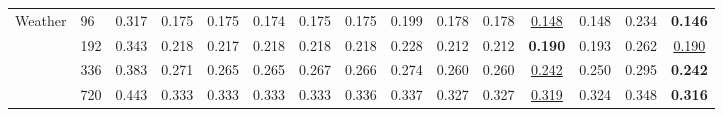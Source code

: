 \begin{tabular}{llccccccccccccc}
\midrule
Weather & 96 & 0.317 & 0.175 & 0.175 & 0.174 & 0.175 & 0.175 & 0.199 & 0.178 & 0.178 & \underline{0.148} & 0.148 & 0.234 & \textbf{0.146} \\
 & 192 & 0.343 & 0.218 & 0.217 & 0.218 & 0.218 & 0.218 & 0.228 & 0.212 & 0.212 & \textbf{0.190} & 0.193 & 0.262 & \underline{0.190} \\
 & 336 & 0.383 & 0.271 & 0.265 & 0.265 & 0.267 & 0.266 & 0.274 & 0.260 & 0.260 & \underline{0.242} & 0.250 & 0.295 & \textbf{0.242} \\
 & 720 & 0.443 & 0.333 & 0.333 & 0.333 & 0.333 & 0.336 & 0.337 & 0.327 & 0.327 & \underline{0.319} & 0.324 & 0.348 & \textbf{0.316} \\
\bottomrule
\end{tabular}